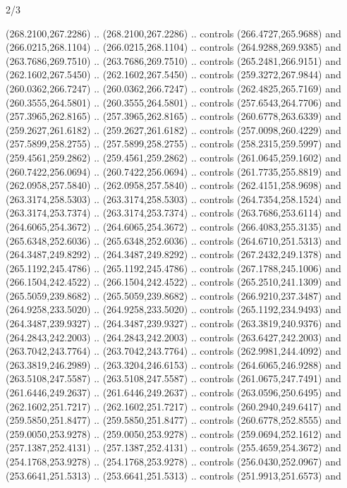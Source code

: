 \begin{flagdescription}{2/3}
\begin{scope}[xshift=0.5\flaglength,yshift=0.5\flagwidth,scale=\flagwidth/318.91]
\begin{scope}[y=0.8pt, x=0.8pt, yscale=-1,shift={(-298.97,-199.32)}]
  (268.2100,267.2286) .. (268.2100,267.2286) .. controls (266.4727,265.9688) and
  (266.0215,268.1104) .. (266.0215,268.1104) .. controls (264.9288,269.9385) and
  (263.7686,269.7510) .. (263.7686,269.7510) .. controls (265.2481,266.9151) and
  (262.1602,267.5450) .. (262.1602,267.5450) .. controls (259.3272,267.9844) and
  (260.0362,266.7247) .. (260.0362,266.7247) .. controls (262.4825,265.7169) and
  (260.3555,264.5801) .. (260.3555,264.5801) .. controls (257.6543,264.7706) and
  (257.3965,262.8165) .. (257.3965,262.8165) .. controls (260.6778,263.6339) and
  (259.2627,261.6182) .. (259.2627,261.6182) .. controls (257.0098,260.4229) and
  (257.5899,258.2755) .. (257.5899,258.2755) .. controls (258.2315,259.5997) and
  (259.4561,259.2862) .. (259.4561,259.2862) .. controls (261.0645,259.1602) and
  (260.7422,256.0694) .. (260.7422,256.0694) .. controls (261.7735,255.8819) and
  (262.0958,257.5840) .. (262.0958,257.5840) .. controls (262.4151,258.9698) and
  (263.3174,258.5303) .. (263.3174,258.5303) .. controls (264.7354,258.1524) and
  (263.3174,253.7374) .. (263.3174,253.7374) .. controls (263.7686,253.6114) and
  (264.6065,254.3672) .. (264.6065,254.3672) .. controls (266.4083,255.3135) and
  (265.6348,252.6036) .. (265.6348,252.6036) .. controls (264.6710,251.5313) and
  (264.3487,249.8292) .. (264.3487,249.8292) .. controls (267.2432,249.1378) and
  (265.1192,245.4786) .. (265.1192,245.4786) .. controls (267.1788,245.1006) and
  (266.1504,242.4522) .. (266.1504,242.4522) .. controls (265.2510,241.1309) and
  (265.5059,239.8682) .. (265.5059,239.8682) .. controls (266.9210,237.3487) and
  (264.9258,233.5020) .. (264.9258,233.5020) .. controls (265.1192,234.9493) and
  (264.3487,239.9327) .. (264.3487,239.9327) .. controls (263.3819,240.9376) and
  (264.2843,242.2003) .. (264.2843,242.2003) .. controls (263.6427,242.2003) and
  (263.7042,243.7764) .. (263.7042,243.7764) .. controls (262.9981,244.4092) and
  (263.3819,246.2989) .. (263.3204,246.6153) .. controls (264.6065,246.9288) and
  (263.5108,247.5587) .. (263.5108,247.5587) .. controls (261.0675,247.7491) and
  (261.6446,249.2637) .. (261.6446,249.2637) .. controls (263.0596,250.6495) and
  (262.1602,251.7217) .. (262.1602,251.7217) .. controls (260.2940,249.6417) and
  (259.5850,251.8477) .. (259.5850,251.8477) .. controls (260.6778,252.8555) and
  (259.0050,253.9278) .. (259.0050,253.9278) .. controls (259.0694,252.1612) and
  (257.1387,252.4131) .. (257.1387,252.4131) .. controls (255.4659,254.3672) and
  (254.1768,253.9278) .. (254.1768,253.9278) .. controls (256.0430,252.0967) and
  (253.6641,251.5313) .. (253.6641,251.5313) .. controls (251.9913,251.6573) and

\end{scope}
\end{scope}
\end{flagdescription}
